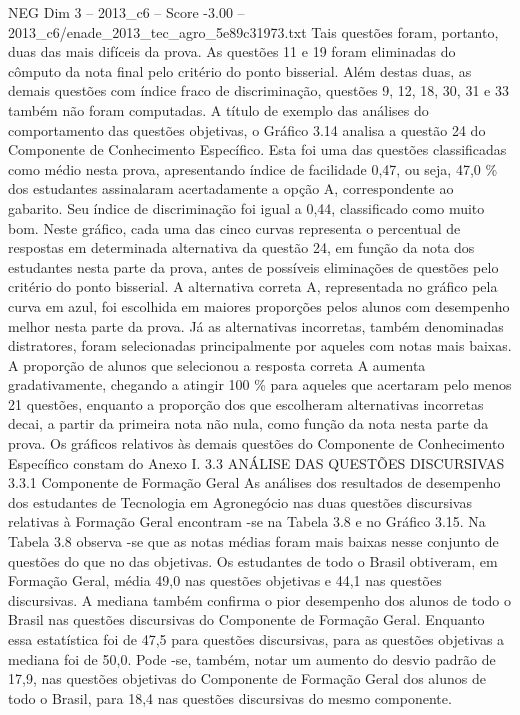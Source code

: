 \begin{textsample}{NEG Dim 3 – 2013\_c6 – Score -3.00 – 2013\_c6/enade\_2013\_tec\_agro\_5e89c31973.txt}
Tais questões foram, portanto, duas das mais difíceis da prova.
As questões 11 e 19 foram eliminadas do cômputo da nota final pelo critério do ponto bisserial.
Além destas duas, as demais questões com índice fraco de discriminação, questões 9, 12, 18, 30, 31 e 33 também não foram computadas.
A título de exemplo das análises do comportamento das questões objetivas, o Gráfico 3.14 analisa a questão 24 do Componente de Conhecimento Específico.
Esta foi uma das questões classificadas como médio nesta prova, apresentando índice de facilidade 0,47, ou seja, 47,0 \% dos estudantes assinalaram acertadamente a opção A, correspondente ao gabarito.
Seu índice de discriminação foi igual a 0,44, classificado como muito bom.
Neste gráfico, cada uma das cinco curvas representa o percentual de respostas em determinada alternativa da questão 24, em função da nota dos estudantes nesta parte da prova, antes de possíveis eliminações de questões pelo critério do ponto bisserial.
A alternativa correta A, representada no gráfico pela curva em azul, foi escolhida em maiores proporções pelos alunos com desempenho melhor nesta parte da prova.
Já as alternativas incorretas, também denominadas distratores, foram selecionadas principalmente por aqueles com notas mais baixas.
A proporção de alunos que selecionou a resposta correta A aumenta gradativamente, chegando a atingir 100 \% para aqueles que acertaram pelo menos 21 questões, enquanto a proporção dos que escolheram alternativas incorretas decai, a partir da primeira nota não nula, como função da nota nesta parte da prova.
Os gráficos relativos às demais questões do Componente de Conhecimento Específico constam do Anexo I. 3.3 ANÁLISE DAS QUESTÕES DISCURSIVAS 3.3.1 Componente de Formação Geral As análises dos resultados de desempenho dos estudantes de Tecnologia em Agronegócio nas duas questões discursivas relativas à Formação Geral encontram -se na Tabela 3.8 e no Gráfico 3.15.
Na Tabela 3.8 observa -se que as notas médias foram mais baixas nesse conjunto de questões do que no das objetivas.
Os estudantes de todo o Brasil obtiveram, em Formação Geral, média 49,0 nas questões objetivas e 44,1 nas questões discursivas.
A mediana também confirma o pior desempenho dos alunos de todo o Brasil nas questões discursivas do Componente de Formação Geral.
Enquanto essa estatística foi de 47,5 para questões discursivas, para as questões objetivas a mediana foi de 50,0.
Pode -se, também, notar um aumento do desvio padrão de 17,9, nas questões objetivas do Componente de Formação Geral dos alunos de todo o Brasil, para 18,4 nas questões discursivas do mesmo componente.

\end{textsample}
